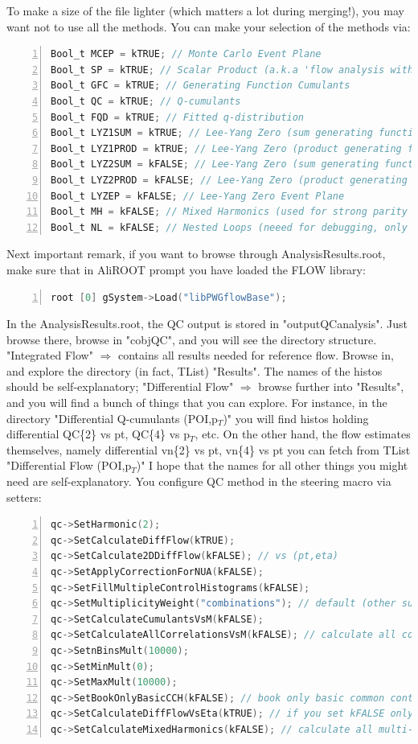 \documentclass[a4paper]{book}
\numberwithin{equation}{subsection}
\begin{document}
 To make a size of the file lighter (which matters a lot during merging!), you may want not to use all the methods. You can make your selection of the methods via:
 	\begin{lstlisting}[language=C, numbers=left]
Bool_t MCEP = kTRUE; // Monte Carlo Event Plane
Bool_t SP = kTRUE; // Scalar Product (a.k.a 'flow analysis with eta gaps')
Bool_t GFC = kTRUE; // Generating Function Cumulants
Bool_t QC = kTRUE; // Q-cumulants
Bool_t FQD = kTRUE; // Fitted q-distribution
Bool_t LYZ1SUM = kTRUE; // Lee-Yang Zero (sum generating function), first pass over the data
Bool_t LYZ1PROD = kTRUE; // Lee-Yang Zero (product generating function), first pass over the data
Bool_t LYZ2SUM = kFALSE; // Lee-Yang Zero (sum generating function), second pass over the data
Bool_t LYZ2PROD = kFALSE; // Lee-Yang Zero (product generating function), second pass over the data
Bool_t LYZEP = kFALSE; // Lee-Yang Zero Event Plane
Bool_t MH = kFALSE; // Mixed Harmonics (used for strong parity violation studies) 
Bool_t NL = kFALSE; // Nested Loops (neeed for debugging, only for developers) 	\end{lstlisting}
 Next important remark, if you want to browse through AnalysisResults.root, make sure that in AliROOT prompt you have loaded the FLOW library:
 	\begin{lstlisting}[language=C, numbers=left]
root [0] gSystem->Load("libPWGflowBase"); 	\end{lstlisting}
 In the AnalysisResults.root, the QC output is stored in "outputQCanalysis". Just browse there, browse in "cobjQC", and you will see the directory structure.
 "Integrated Flow" $\Rightarrow$ contains all results needed for reference flow. Browse in, and explore the directory (in fact, TList) "Results". The names of the histos should be self-explanatory;
 "Differential Flow" $\Rightarrow$ browse further into "Results", and you will find a bunch of things that you can explore. For instance, in the directory "Differential Q-cumulants (POI,p$_{T}$)" you will find histos holding differential QC\{2\} vs pt, QC\{4\} vs p$_{T}$, etc. On the other hand, the flow estimates themselves, namely differential vn\{2\} vs pt, vn\{4\} vs pt you can fetch from TList "Differential Flow (POI,p$_{T}$)"
 I hope that the names for all other things you might need are self-explanatory. 
 You configure QC method in the steering macro via setters:
 	\begin{lstlisting}[language=C, numbers=left]
qc->SetHarmonic(2);
qc->SetCalculateDiffFlow(kTRUE);
qc->SetCalculate2DDiffFlow(kFALSE); // vs (pt,eta)
qc->SetApplyCorrectionForNUA(kFALSE);
qc->SetFillMultipleControlHistograms(kFALSE); 
qc->SetMultiplicityWeight("combinations"); // default (other supported options are "unit" and "multiplicity")
qc->SetCalculateCumulantsVsM(kFALSE);
qc->SetCalculateAllCorrelationsVsM(kFALSE); // calculate all correlations in mixed harmonics "vs M"
qc->SetnBinsMult(10000);
qc->SetMinMult(0);
qc->SetMaxMult(10000); 
qc->SetBookOnlyBasicCCH(kFALSE); // book only basic common control histograms
qc->SetCalculateDiffFlowVsEta(kTRUE); // if you set kFALSE only differential flow vs pt is calculated
qc->SetCalculateMixedHarmonics(kFALSE); // calculate all multi-partice mixed-harmonics correlators	\end{lstlisting}
\end{document}

